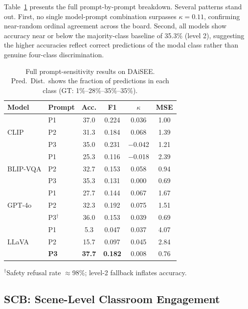 Table~\ref{tab:daisee_allprompts} presents the full prompt-by-prompt
breakdown.  Several patterns stand out.  First, no single model-prompt
combination surpasses $\kappa\!=\!0.11$, confirming near-random
ordinal agreement across the board.  Second, all models show accuracy
near or below the majority-class baseline of 35.3\% (level 2),
suggesting the higher accuracies reflect correct predictions of the
modal class rather than genuine four-class discrimination.

\begin{table}[t]
\centering
\small
\caption{Full prompt-sensitivity results on DAiSEE.  Pred.\ Dist.\ shows
  the fraction of predictions in each class (GT: 1\%--28\%--35\%--35\%).}
\label{tab:daisee_allprompts}
\setlength{\tabcolsep}{3pt}
\begin{tabular}{@{}llcccc@{}}
\toprule
Model & Prompt & Acc. & F1 & $\kappa$ & MSE \\
\midrule
\multirow{3}{*}{CLIP}
  & P1 & 37.0 & 0.224 & 0.036 & 1.00 \\
  & P2 & 31.3 & 0.184 & 0.068 & 1.39 \\
  & P3 & 35.0 & 0.231 & $-$0.042 & 1.21 \\
\midrule
\multirow{3}{*}{BLIP-VQA}
  & P1 & 25.3 & 0.116 & $-$0.018 & 2.39 \\
  & P2 & 32.7 & 0.153 & 0.058 & 0.94 \\
  & P3 & 35.3 & 0.131 & 0.000 & 0.69 \\
\midrule
\multirow{3}{*}{GPT-4o}
  & P1 & 27.7 & 0.144 & 0.067 & 1.67 \\
  & P2 & 32.3 & 0.192 & 0.075 & 1.51 \\
  & P3$^\dagger$ & 36.0 & 0.153 & 0.039 & 0.69 \\
\midrule
\multirow{3}{*}{LLaVA}
  & P1 & 5.3 & 0.047 & 0.037 & 4.07 \\
  & P2 & 15.7 & 0.097 & 0.045 & 2.84 \\
  & \textbf{P3} & \textbf{37.7} & \textbf{0.182} & 0.008 & 0.76 \\
\bottomrule
\end{tabular}
\vspace{1pt}
\begin{minipage}{\linewidth}
  \scriptsize $^\dagger$Safety refusal rate $\approx$98\%; level-2 fallback inflates accuracy.
\end{minipage}
\end{table}

\subsection{SCB: Scene-Level Classroom Engagement}
\label{sec:scb_results}

